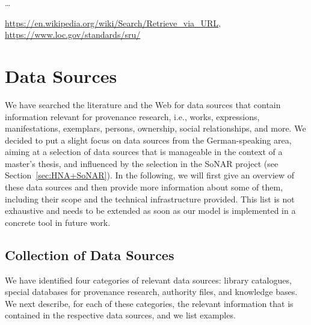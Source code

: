\dots

\url{https://en.wikipedia.org/wiki/Search/Retrieve_via_URL}, \url{https://www.loc.gov/standards/sru/}



\section{Data Sources}
\label{sec:data_sources}

We have searched the literature and the Web for data sources that contain information
relevant for provenance research, i.e., works, expressions, manifestations, exemplars,
persons, ownership, social relationships, and more. 
We decided to put a slight focus on data sources from the German-speaking area, 
aiming at a selection of data sources that is manageable in the context of a master's thesis,
and influenced by the selection in the \gls{SoNAR} project (see Section~\ref{sec:HNA+SoNAR}).
In the following, we will first give an overview of these data sources
and then provide more information about some of them,
including their scope and the technical infrastructure provided.
This list is not exhaustive and needs to be extended
as soon as our model is implemented in a concrete tool in future work.

\subsection{Collection of Data Sources}

We have identified four categories of relevant data sources:
library catalogues, special databases for provenance research, authority files, and knowledge bases.
We next describe, for each of these categories, the relevant information that is
contained in the respective data sources, and we list examples.

